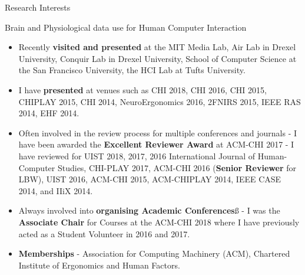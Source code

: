 \documentclass{resume} %
\begin{document}
\begin{rSection}{Research Interests}
\begin{rSubsection}{Brain and Physiological data use for Human Computer Interaction}{ }{ }{ }
\begin{itemize}
	\item Recently \textbf{visited and presented} at the MIT Media Lab, Air Lab in Drexel University, Conquir Lab in Drexel University, School of Computer Science at the San Francisco University, the HCI Lab at Tufts University.
	\item I have  \textbf{presented} at venues such as CHI 2018, CHI 2016, CHI 2015, CHIPLAY 2015, CHI 2014, NeuroErgonomics 2016, 2FNIRS 2015, IEEE RAS 2014, EHF 2014.
	\vspace{-2mm}
	\item Often involved in the review process for multiple conferences and journals - I have been awarded the \textbf{Excellent Reviewer Award} at ACM-CHI 2017 - I have reviewed for UIST 2018, 2017, 2016 International Journal of Human-Computer Studies, CHI-PLAY 2017, ACM-CHI 2016 (\textbf{Senior Reviewer} for LBW), UIST 2016, ACM-CHI 2015, ACM-CHIPLAY 2014, IEEE CASE 2014, and IIiX 2014.
	\vspace{-2mm}
	\item Always involved into \textbf{organising Academic Conferences}ß - I was the \textbf{Associate Chair} for Courses at the ACM-CHI 2018 where I have previously acted as a Student Volunteer in 2016 and 2017.
	\vspace{-2mm}
	\item  \textbf{Memberships} - Association for Computing Machinery (ACM), Chartered Institute of Ergonomics and Human Factors.
\end{itemize}

\end{rSubsection}

\end{rSection}
	\vspace{-3mm}
\end{document}
